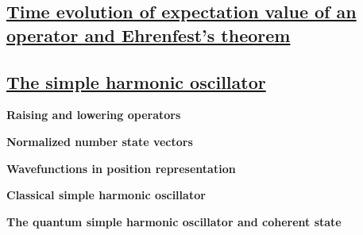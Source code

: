 \subsection{\underline{Time evolution of expectation value of an operator and Ehrenfest's theorem}}

\subsection{\underline{The simple harmonic oscillator}}

\textbf{Raising and lowering operators}

\textbf{Normalized number state vectors}

\textbf{Wavefunctions in position representation}

\textbf{Classical simple harmonic oscillator}

\textbf{The quantum simple harmonic oscillator and coherent state}






